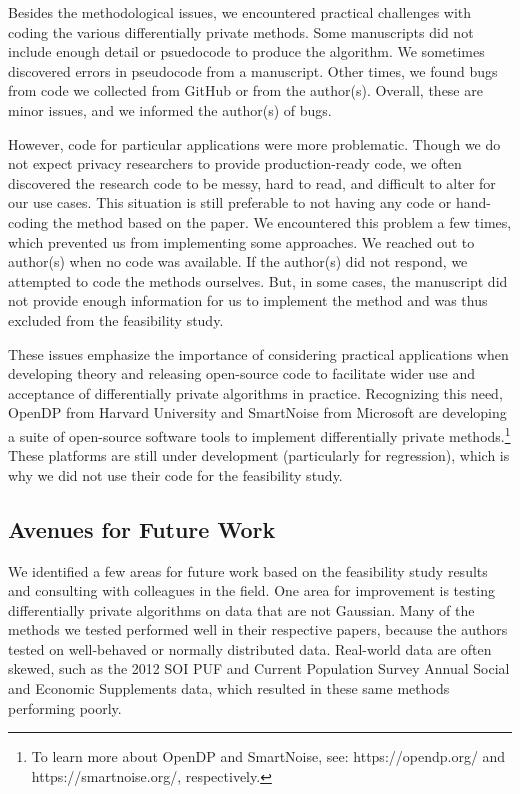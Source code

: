 Besides the methodological issues, we encountered practical challenges with coding the various differentially private methods. Some manuscripts did not include enough detail or psuedocode to produce the algorithm. We sometimes discovered errors in pseudocode from a manuscript. Other times, we found bugs from code we collected from GitHub or from the author(s). Overall, these are minor issues, and we informed the author(s) of bugs.

However, code for particular applications were more problematic. Though we do not expect privacy researchers to provide production-ready code, we often discovered the research code to be messy, hard to read, and difficult to alter for our use cases. This situation is still preferable to not having any code or hand-coding the method based on the paper. We encountered this problem a few times, which prevented us from implementing some approaches. We reached out to author(s) when no code was available. If the author(s) did not respond, we attempted to code the methods ourselves. But, in some cases, the manuscript did not provide enough information for us to implement the method and was thus excluded from the feasibility study.

These issues emphasize the importance of considering practical applications when developing theory and releasing open-source code to facilitate wider use and acceptance of differentially private algorithms in practice. Recognizing this need, OpenDP from Harvard University and SmartNoise from Microsoft are developing a suite of open-source software tools to implement differentially private methods.\footnote{To learn more about OpenDP and SmartNoise, see: https://opendp.org/ and https://smartnoise.org/, respectively.} These platforms are still under development (particularly for regression), which is why we did not use their code for the feasibility study.

\subsection{Avenues for Future Work}\label{subsec:future}
We identified a few areas for future work based on the feasibility study results and consulting with colleagues in the field. One area for improvement is testing differentially private algorithms on data that are not Gaussian. Many of the methods we tested performed well in their respective papers, because the authors tested on well-behaved or normally distributed data. Real-world data are often skewed, such as the 2012 SOI PUF and Current Population Survey Annual Social and Economic Supplements data, which resulted in these same methods performing poorly.

